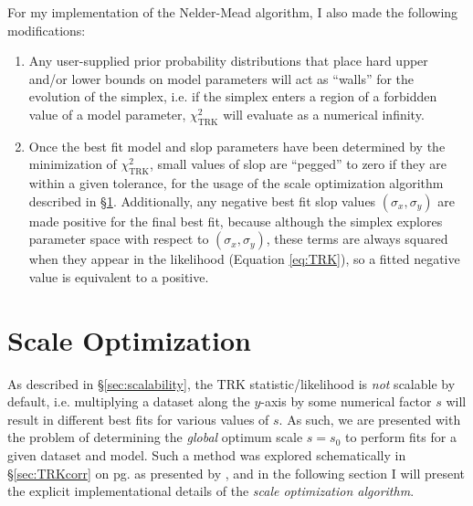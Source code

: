 For my implementation of the Nelder-Mead algorithm, I also made the following modifications:
\begin{enumerate}
    \item \label{enum:newsimplex1}Any user-supplied prior probability distributions that place hard upper and/or lower bounds on model parameters will act as ``walls'' for the evolution of the simplex, i.e. if the simplex enters a region of a forbidden value of a model parameter, $\chi^2_\text{TRK}$ will evaluate as a numerical infinity.
    \item \label{enum:newsimplex2}Once the best fit model and slop parameters have been determined by the minimization of $\chi^2_\text{TRK}$, small values of slop are ``pegged'' to zero if they are within a given tolerance, for the usage of the scale optimization algorithm described in \S\ref{sec:scaleop}. Additionally, any negative best fit slop values $(\sigma_x,\sigma_y)$ are made positive for the final best fit, because although the simplex explores parameter space with respect to $(\sigma_x,\sigma_y)$, these terms are always squared when they appear in the likelihood (Equation \eqref{eq:TRK}), so a fitted negative value is equivalent to a positive.
\end{enumerate}

\section{Scale Optimization}
\label{sec:scaleop}

As described in \S\ref{sec:scalability}, the TRK statistic/likelihood is \textit{not} scalable by default, i.e. multiplying a dataset along the $y$-axis by some numerical factor $s$ will result in different best fits for various values of $s$. As such, we are presented with the problem of determining the \textit{global} optimum scale $s=s_0$ to perform fits for a given dataset and model. Such a method was explored schematically in \S\ref{sec:TRKcorr} on pg. \pageref{par:scaleopscheme} as presented by \textcite{trotter}, and in the following section I will present the explicit implementational details of the \textit{scale optimization algorithm}. 

